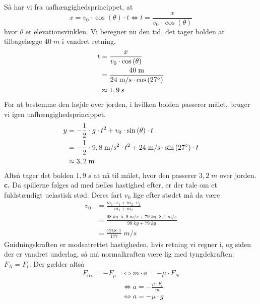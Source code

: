 \documentclass{report}
\begin{document}
Så har vi fra uafhængighedsprincippet, at
\[
x=v_0 \cdot \cos\left(\theta \right) \cdot t \iff t=\frac{x}{v_0 \cdot \cos\left(\theta \right) }
\] 
hvor $\theta $ er elevationsvinklen. 
Vi beregner nu den tid, det tager bolden at tilbagelægge $40 \;\unit{m} $ i vandret retning. 
\begin{equation*}
\begin{split}
  t&=\frac{x}{v_0 \cdot \cos\left(\theta \right) }\\
  &=\frac{40 \;\unit{m} }{24 \;\unit{m/s} \cdot \cos\left(27 \degree \right) }\\
  &\approx 1,9 \;\unit{s} 
\end{split}
\end{equation*}
For at bestemme den højde over jorden, i hvilken bolden passerer målet, bruger vi igen uafhængighedsprincippet.
\begin{equation*}
\begin{split}
  y&=-\frac{1}{2} \cdot g \cdot t^2 + v_0 \cdot \sin\left(\theta \right) \cdot t\\
  &=-\frac{1}{2} \cdot 9,8 \;\unit{m/s^2} \cdot t^2 + 24 \;\unit{m/s} \cdot \sin\left(27 \degree \right) \cdot t \\
  &\approx 3,2 \;\unit{m} 
\end{split}
\end{equation*}
Altså tager det bolden $1,9 \;\unit{s} $ at nå til målet, hvor den passerer $3,2 \;\unit{m} $ over jorden. \\[1ex]
\textbf{c.}
Da spillerne følges ad med fælles hastighed efter, er der tale om et fuldstændigt uelastisk stød.
Deres fart $v_0$ lige efter stødet må da være
\begin{equation*}
\begin{split}
  v_0&=\frac{m_1 \cdot v_1 + m_2 \cdot v_2}{m_1+m_2}\\
  &=\frac{98 \;\unit{kg} \cdot 5,9 \;\unit{m/s} + 79 \;\unit{kg} \cdot 8,1 \;\unit{m/s} }{98 \;\unit{kg} + 79 \;\unit{kg} }\\
  &=\frac{1218,1}{177} \;\unit{m/s} 
\end{split}
\end{equation*}
Gnidningskraften er modsatrettet hastigheden, hvis retning vi regner i, og siden der er vandret underlag, så må normalkraften være lig med tyngdekraften: $F_N=F_t$.
Der gælder altså
\begin{equation*}
\begin{split}
  F _{\text{res} }=-F _{\mu } &\iff m \cdot a = -\mu \cdot F_N\\
  &\iff a=-\frac{\mu \cdot F_t}{m}\\
  &\iff a=-\mu \cdot g
\end{split}
\end{equation*}
\end{document}
